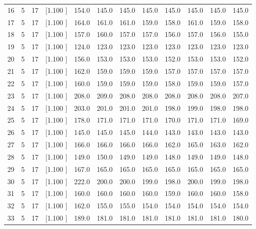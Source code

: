 \documentclass[12pt,a4paper]{article}
\begin{document}
\begin{center}
{\begin{tabular}{r r r r r r r r r r r r}
  16&  5& 17&[1.100     ]&   154.0&   145.0&   145.0&   145.0&   145.0&   145.0&   145.0&   145.0\\[-0.02in]
  17&  5& 17&[1.100     ]&   164.0&   161.0&   161.0&   159.0&   158.0&   161.0&   159.0&   158.0\\[-0.02in]
  18&  5& 17&[1.100     ]&   157.0&   160.0&   157.0&   157.0&   156.0&   157.0&   156.0&   155.0\\[-0.02in]
  19&  5& 17&[1.100     ]&   124.0&   123.0&   123.0&   123.0&   123.0&   123.0&   123.0&   123.0\\[-0.02in]
  20&  5& 17&[1.100     ]&   156.0&   153.0&   153.0&   153.0&   152.0&   153.0&   153.0&   152.0\\[-0.02in]
  21&  5& 17&[1.100     ]&   162.0&   159.0&   159.0&   159.0&   157.0&   157.0&   157.0&   157.0\\[-0.02in]
  22&  5& 17&[1.100     ]&   160.0&   159.0&   159.0&   159.0&   158.0&   159.0&   159.0&   157.0\\[-0.02in]
  23&  5& 17&[1.100     ]&   208.0&   209.0&   208.0&   208.0&   208.0&   208.0&   208.0&   207.0\\[-0.02in]
  24&  5& 17&[1.100     ]&   203.0&   201.0&   201.0&   201.0&   198.0&   199.0&   198.0&   198.0\\[-0.02in]
  25&  5& 17&[1.100     ]&   178.0&   171.0&   171.0&   171.0&   170.0&   171.0&   171.0&   169.0\\[-0.02in]
  26&  5& 17&[1.100     ]&   145.0&   145.0&   145.0&   144.0&   143.0&   143.0&   143.0&   143.0\\[-0.02in]
  27&  5& 17&[1.100     ]&   166.0&   166.0&   166.0&   166.0&   162.0&   165.0&   163.0&   162.0\\[-0.02in]
  28&  5& 17&[1.100     ]&   149.0&   150.0&   149.0&   149.0&   148.0&   149.0&   149.0&   148.0\\[-0.02in]
  29&  5& 17&[1.100     ]&   167.0&   165.0&   165.0&   165.0&   165.0&   165.0&   165.0&   165.0\\[-0.02in]
  30&  5& 17&[1.100     ]&   222.0&   200.0&   200.0&   199.0&   198.0&   200.0&   199.0&   198.0\\[-0.02in]
  31&  5& 17&[1.100     ]&   160.0&   160.0&   160.0&   160.0&   159.0&   160.0&   160.0&   158.0\\[-0.02in]
  32&  5& 17&[1.100     ]&   162.0&   155.0&   155.0&   154.0&   154.0&   154.0&   154.0&   154.0\\[-0.02in]
  33&  5& 17&[1.100     ]&   189.0&   181.0&   181.0&   181.0&   181.0&   181.0&   181.0&   180.0\\[-0.02in]

\end{tabular}}
\end{center}
\end{document}
